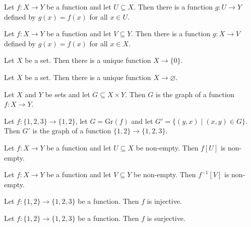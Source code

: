 \begin{chapex} %
\label{cqFunctionsASNBegin}
Let $f : X \to Y$ be a function and let $U \subseteq X$. Then there is a function $g : U \to Y$ defined by $g(x) = f(x)$ for all $x \in U$.
\end{chapex}

\begin{chapex} %
Let $f : X \to Y$ be a function and let $V \subseteq Y$. Then there is a function $g : X \to V$ defined by $g(x) = f(x)$ for all $x \in X$.
\end{chapex}

\begin{chapex} %
Let $X$ be a set. Then there is a unique function $X \to \{ 0 \}$.
\end{chapex}

\begin{chapex} %
Let $X$ be a set. Then there is a unique function $X \to \varnothing$.
\end{chapex}

\begin{chapex} %
Let $X$ and $Y$ be sets and let $G \subseteq X \times Y$. Then $G$ is the graph of a function $f : X \to Y$.
\end{chapex}

\begin{chapex} %
Let $f : \{ 1, 2, 3 \} \to \{ 1, 2 \}$, let $G = \mathrm{Gr}(f)$ and let $G' = \{ (y,x) \mid (x,y) \in G \}$. Then $G'$ is the graph of a function $\{ 1, 2 \} \to \{ 1, 2, 3 \}$.
\end{chapex}

\begin{chapex} %
Let $f : X \to Y$ be a function and let $U \subseteq X$ be non-empty. Then $f[U]$ is non-empty.
\end{chapex}

\begin{chapex} %
Let $f : X \to Y$ be a function and let $V \subseteq Y$ be non-empty. Then $f^{-1}[V]$ is non-empty.
\end{chapex}

\begin{chapex} %
Let $f : \{ 1, 2 \} \to \{ 1, 2, 3 \}$ be a function. Then $f$ is injective.
\end{chapex}

\begin{chapex} %
Let $f : \{ 1, 2 \} \to \{ 1, 2, 3 \}$ be a function. Then $f$ is surjective.
\end{chapex}

